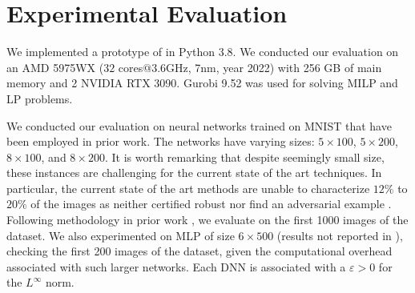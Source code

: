
\section{Experimental Evaluation}


We implemented a prototype of {\toolname} in Python 3.8.  We conducted our evaluation on an AMD 5975WX  ($32$ cores$@3.6$GHz, 7nm, year 2022) with 256 GB of main memory and 2 NVIDIA RTX 3090. Gurobi 9.52 was used for solving MILP and LP problems. 

We conducted our evaluation on neural networks trained on MNIST that have been employed in prior work. The networks have varying sizes: $5\times 100$, $5\times 200$, $8 \times 100$, and $8 \times 200$. It is worth remarking that despite seemingly small size, these instances are challenging for the current state of the art techniques. In particular, the current state of the art methods are unable to characterize $12\%$ to $20\%$ of the images as neither certified robust \cite{crown} nor find an adversarial example \cite{attack}. Following methodology in prior work \cite{prima,crown}, we evaluate on the first 1000 images of the dataset. We also experimented on MLP of size $6\times 500$ (results not reported in \cite{prima,crown}), checking the first 200 images of the dataset, given the computational overhead associated with such larger networks. Each DNN is associated with a $\varepsilon>0$ for the $L^\infty$ norm. 

